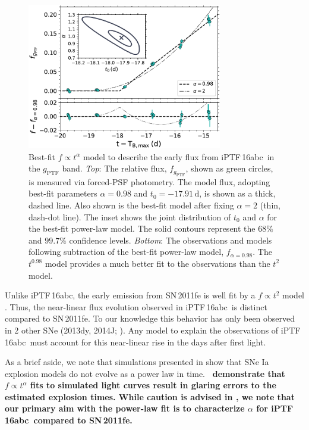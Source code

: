 \documentclass[twocolumn]{aastex61}
\newcommand{\abc}{iPTF\,16abc}
\begin{document}
\begin{figure}[!htb]
  \centering
  \includegraphics[width=3.35in]{early_lc.pdf}
  \caption{
  Best-fit $f \propto t^\alpha$ model to describe the early flux from \abc\ in
  the $g_\mathrm{PTF}$ band. \textit{Top}: The relative flux,
  $f_{g_\mathrm{PTF}}$, shown as green circles, is measured via forced-PSF
  photometry. The model flux, adopting best-fit parameters $\alpha=0.98$ and
  $t_0=-17.91\,\textrm{d}$, is shown as a thick, dashed line. Also shown is
  the best-fit model after fixing $\alpha=2$ (thin, dash-dot line). The inset
  shows the joint distribution of $t_0$ and $\alpha$ for the best-fit
  power-law model. The solid contours represent the $68\%$ and $99.7\%$
  confidence levels. \textit{Bottom}: The observations and models following
  subtraction of the best-fit power-law model, $f_{\alpha = 0.98}$. The
  $t^{0.98}$ model provides a much better fit to the observations than the
  $t^2$ model.}
  \label{fig:early_lc_fit}
\end{figure}

Unlike \abc, the early emission from SN\,2011fe is well fit by a $f \propto
t^2$ model \citep{2011Natur.480..344N}. Thus, the near-linear flux evolution
observed in \abc\ is distinct compared to SN\,2011fe. To our knowledge this
behavior has only been observed in 2 other SNe (2013dy, 2014J;
\citealt{2013ApJ...778L..15Z,2014ApJ...783L..24Z,2015ApJ...799..106G}). Any
model to explain the observations of \abc\ must account for this near-linear
rise in the days after first light.

As a brief aside, we note that simulations presented in
\citet{2017MNRAS.472.2787N} show that SNe Ia explosion models do not evolve as
a power law in time. \textbf{\citeauthor{2017MNRAS.472.2787N}\ demonstrate
that $f \propto t^\alpha$ fits to simulated light curves result in glaring
errors to the estimated explosion times. While caution is advised in
\citet{2017MNRAS.472.2787N}, we note that our primary aim with the power-law
fit is to characterize $\alpha$ for \abc\ compared to SN\,2011fe.}
\end{document}
